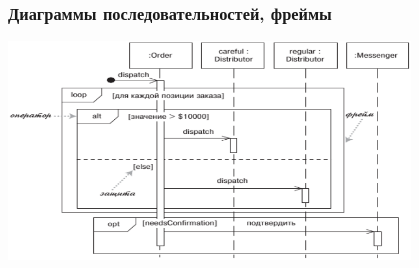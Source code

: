 \documentclass[xetex,mathserif,serif]{beamer}
\begin{document}
	\begin{frame}
		\frametitle{Диаграммы последовательностей, фреймы}
		\begin{center}
			\includegraphics[width=0.8\textwidth]{sequenceFrames.png}
		\end{center}
	\end{frame}
\end{document}
